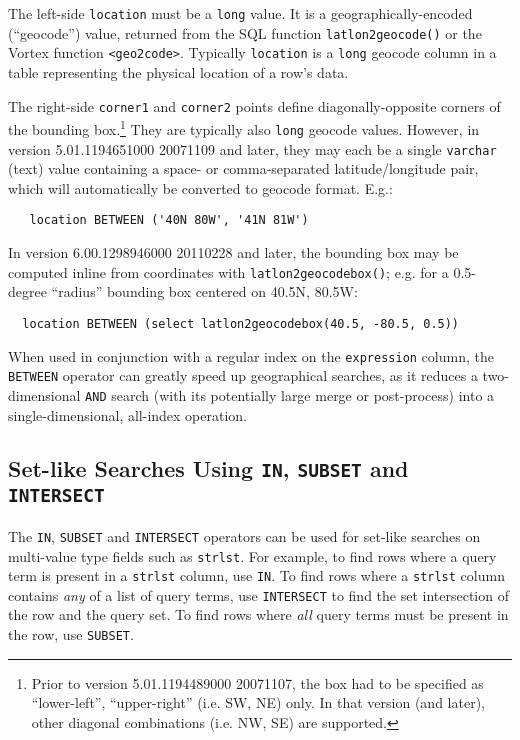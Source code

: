 The left-side \verb`location` must be a \verb`long` value.  It is a
geographically-encoded (``geocode'') value, returned from the SQL
function \verb`latlon2geocode()` or the Vortex function
\verb`<geo2code>`.  Typically \verb`location` is a \verb`long` geocode
column in a table representing the physical location of a row's data.

The right-side \verb`corner1` and \verb`corner2` points define
diagonally-opposite corners of the bounding box.\footnote{Prior to
version 5.01.1194489000 20071107, the box had to be specified as
``lower-left'', ``upper-right'' (i.e. SW, NE) only.  In that version
(and later), other diagonal combinations (i.e. NW, SE) are supported.}
They are typically also \verb`long` geocode values.  However, in
version 5.01.1194651000 20071109 and later, they may each be a single
\verb`varchar` (text) value containing a space- or comma-separated
latitude/longitude pair, which will automatically be converted to
geocode format.  E.g.:

\begin{verbatim}
   location BETWEEN ('40N 80W', '41N 81W')
\end{verbatim}

In version 6.00.1298946000 20110228 and later, the bounding box may be
computed inline from coordinates with \verb`latlon2geocodebox()`;
e.g. for a 0.5-degree ``radius'' bounding box centered on 40.5N, 80.5W:

\begin{verbatim}
  location BETWEEN (select latlon2geocodebox(40.5, -80.5, 0.5))
\end{verbatim}

When used in conjunction with a regular index on the \verb`expression`
column, the \verb`BETWEEN` operator can greatly speed up geographical
searches, as it reduces a two-dimensional {\tt AND} search (with its
potentially large merge or post-process) into a single-dimensional,
all-index operation.

\subsection{Set-like Searches Using {\tt IN}, {\tt SUBSET} and {\tt INTERSECT}}

  The {\tt IN}, {\tt SUBSET} and {\tt INTERSECT} operators can be used
for set-like searches on multi-value type fields such as
\verb`strlst`.  For example, to find rows where a query term is
present in a {\tt strlst} column, use {\tt IN}.  To find rows where a
\verb`strlst` column contains {\em any} of a list of query terms, use
{\tt INTERSECT} to find the set intersection of the row and the query
set.  To find rows where {\em all} query terms must be present in the
row, use {\tt SUBSET}.

